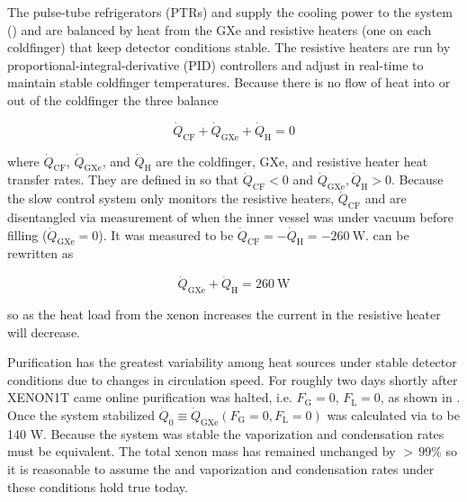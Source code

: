 The pulse-tube refrigerators (PTRs) and  supply the cooling power to the system () and are balanced
by heat from the GXe and resistive heaters (one on each coldfinger) that keep detector conditions stable.  The resistive heaters are run
by proportional-integral-derivative (PID) controllers and adjust in real-time to maintain stable coldfinger temperatures.  Because there
is no flow of heat into or out of the coldfinger the three balance

\vspace{-10pt}

\begin{equation}
\dot{Q}_{\mathrm{CF}} + \dot{Q}_{\mathrm{GXe}} + \dot{Q}_{\mathrm{H}} = 0
\label{eq:electron_lifetime_model_vap_and_cond_heat_cons}
\end{equation}

\noindent where $\dot{Q}_{\mathrm{CF}}$, $\dot{Q}_{\mathrm{GXe}}$, and $\dot{Q}_{\mathrm{H}}$ are the coldfinger, GXe, and resistive
heater heat transfer rates.  They are defined in  so that
$\dot{Q}_{\mathrm{CF}} < 0$ and $\dot{Q}_{\mathrm{GXe}}, \dot{Q}_{\mathrm{H}} > 0$.  Because the slow control system only monitors the
resistive heaters, $\dot{Q}_{\mathrm{CF}}$ and \qdg are disentangled via measurement of \qdh when the
inner vessel was under vacuum before filling ($\dot{Q}_{\mathrm{GXe}} = 0$).  It was measured
to be $\dot{Q}_{\mathrm{CF}} = -\dot{Q}_{\mathrm{H}} = -260\ \mathrm{W}$.   can
be rewritten as

\vspace{-10pt}

\begin{equation}
\dot{Q}_{\mathrm{GXe}} + \dot{Q}_{\mathrm{H}} = 260\ \mathrm{W}
\label{eq:electron_lifetime_model_vap_and_cond_heat_gxe}
\end{equation}

\noindent so as the heat load from the xenon increases the current in the resistive heater will decrease.

Purification has the greatest variability among heat sources under stable detector conditions due to changes in circulation speed.  For
roughly two days shortly after XENON1T came online purification was halted, i.e. $F_{\mathrm{G}} = 0$, $F_{\mathrm{L}} = 0$, as shown in
.  Once the system stabilized
$\dot{Q}_0 \equiv \dot{Q}_{\mathrm{GXe}}(F_{\mathrm{G}} = 0, F_{\mathrm{L}} = 0)$ was calculated via
 to be 140 W.  Because the system was stable the vaporization and condensation
rates must be equivalent.  The total xenon mass has remained unchanged by ${>}\, 99\%$ so it is reasonable to assume the \qdh and
vaporization and condensation rates under these conditions hold true today.

